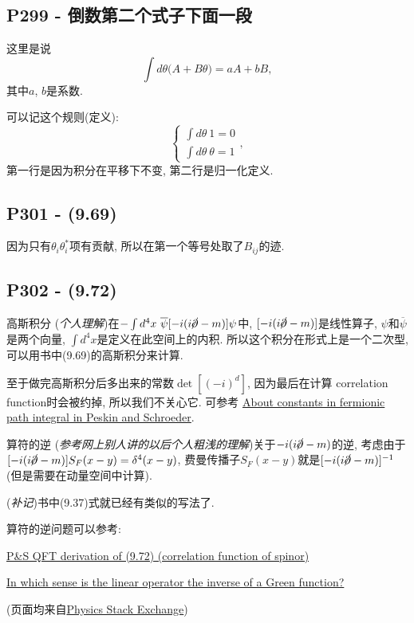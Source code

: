   \subsection{P299 - 倒数第二个式子下面一段}
  这里是说
  \begin{equation}
    \int d\theta\bigl(A+B\theta\bigr) = aA + bB,
  \end{equation}
  其中$a$, $b$是系数.

  可以记这个规则(定义):
  \begin{equation}
    \left\{\begin{array}{c}
      \int d\theta\ 1 = 0 \\
      \int d\theta\ \theta = 1
    \end{array}\right.,
  \end{equation}
  第一行是因为积分在平移下不变, 第二行是归一化定义.

  \subsection{P301 - (9.69)}
  因为只有$\theta_i \theta^*_i$项有贡献, 所以在第一个等号处取了$B_{ij}$的迹.

  \subsection{P302 - (9.72)}
  \begin{mybox}{高斯积分}
    (\textit{个人理解})在$-\int d^4x\ \overline{\psi}[-i(i\cancel{\partial}-m)]\psi$中, $[-i(i\cancel{\partial}-m)]$是线性算子, $\psi$和$\overline{\psi}$是两个向量, $\int d^4x$是定义在此空间上的内积.
    所以这个积分在形式上是一个二次型, 可以用书中(9.69)的高斯积分来计算.

    至于做完高斯积分后多出来的常数$\det[(-i)^d]$, 因为最后在计算 correlation function时会被约掉, 所以我们不关心它.
    可参考 \href{https://physics.stackexchange.com/questions/405876/in-which-sense-is-the-linear-operator-the-inverse-of-a-green-function}{About constants in fermionic path integral in Peskin and Schroeder}.
  \end{mybox}

  \begin{mybox}{算符的逆}
    (\textit{参考网上别人讲的以后个人粗浅的理解})关于$-i(i\cancel{\partial}-m)$的逆, 考虑由于$[-i(i\cancel{\partial}-m)]S_F(x-y)=\delta^4(x-y)$, 费曼传播子$S_F(x-y)$就是$[-i(i\cancel{\partial}-m)]^{-1}$(但是需要在动量空间中计算).

    (\textit{补记})书中(9.37)式就已经有类似的写法了.

    \mbox{}

    算符的逆问题可以参考:

    \href{https://physics.stackexchange.com/questions/737484/ps-qft-derivation-of-9-72-correlation-function-of-spinor}{P\&S QFT derivation of (9.72) (correlation function of spinor)}

    \href{https://physics.stackexchange.com/questions/405876/in-which-sense-is-the-linear-operator-the-inverse-of-a-green-function}{In which sense is the linear operator the inverse of a Green function?}

    (页面均来自\href{https://physics.stackexchange.com/}{Physics Stack Exchange})
  \end{mybox}

